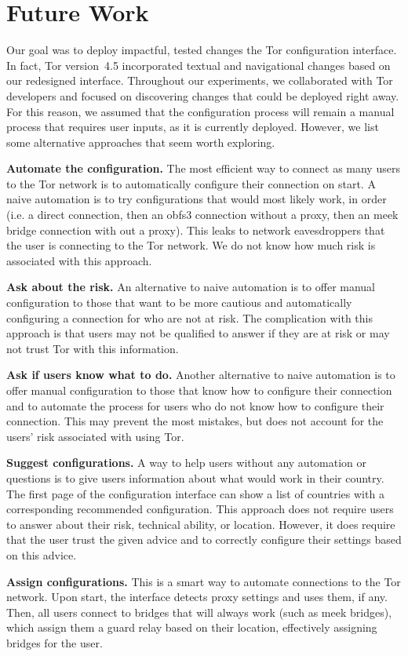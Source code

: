 \documentclass[USenglish,oneside,twocolumn]{article}
\begin{document}
\section{Future Work} 
Our goal was to deploy impactful, tested changes the Tor configuration interface. In fact, Tor version~4.5 incorporated textual and navigational changes based on our redesigned interface. Throughout our experiments, we collaborated with Tor developers and focused on discovering changes that could be deployed right away. For this reason, we assumed that the configuration process will remain a manual process that requires user inputs, as it is currently deployed. However, we list some alternative approaches that seem worth exploring. \\

\begin{description}
\item{\bfseries Automate the configuration.} The most efficient way to connect as many users to the Tor network is to automatically configure their connection on start. A naive automation is to try configurations that would most likely work, in order (i.e. a direct connection, then an obfs3 connection without a proxy, then an meek bridge connection with out a proxy). This leaks to network eavesdroppers that the user is connecting to the Tor network. We do not know how much risk is associated with this approach. 
\item{\bfseries Ask about the risk.} An alternative to naive automation is to offer manual configuration to those that want to be more cautious and automatically configuring a connection for who are not at risk. The complication with this approach is that users may not be qualified to answer if they are at risk or may not trust Tor with this information. 
\item{\bfseries Ask if users know what to do.} Another alternative to naive automation is to offer manual configuration to those that know how to configure their connection and to automate the process for users who do not know how to configure their connection. This may prevent the most mistakes, but does not account for the users' risk associated with using Tor. 
\item{\bfseries Suggest configurations.} A way to help users without any automation or questions is to give users information about what would work in their country. The first page of the configuration interface can show a list of countries with a corresponding recommended configuration. This approach does not require users to answer about their risk, technical ability, or location. However, it does require that the user trust the given advice and to correctly configure their settings based on this advice. 
\item{\bfseries Assign configurations.} This is a smart way to automate connections to the Tor network. Upon start, the interface detects proxy settings and uses them, if any. Then, all users connect to bridges that will always work (such as meek bridges), which assign them a guard relay based on their location, effectively assigning bridges for the user. 
\end{description}
\end{document}
